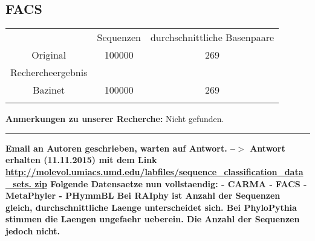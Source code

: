\documentclass[a4paper, 11pt]{scrartcl}
\begin{document}
\begin{flushleft}
\subsection{FACS}
\begin{tabular}{ccc}
& Sequenzen & durchschnittliche Basenpaare \\
Original&100000&269\\
Rechercheergebnis&&\\
Bazinet&100000&269\\
&&\\
\end{tabular}
\linebreak
\color{red}
\textbf{Anmerkungen zu unserer Recherche:}\linebreak
Nicht gefunden. 
\linebreak
\linebreak
\noindent\rule{\textwidth}{1pt}
\newpage
\textbf{Email an Autoren geschrieben, warten auf Antwort. --$>$ Antwort erhalten (11.11.2015) mit dem Link \url{http://molevol.umiacs.umd.edu/labfiles/sequence_classification_data_sets.
zip} \linebreak
Folgende Datensaetze nun vollstaendig:\linebreak
- CARMA\linebreak
- FACS\linebreak
- MetaPhyler\linebreak
- PHymmBL\linebreak
Bei RAIphy ist Anzahl der Sequenzen gleich, durchschnittliche Laenge unterscheidet sich.\linebreak
Bei PhyloPythia stimmen die Laengen ungefaehr ueberein. Die Anzahl der Sequenzen jedoch nicht.}
\newpage


\end{flushleft}
\end{document}
